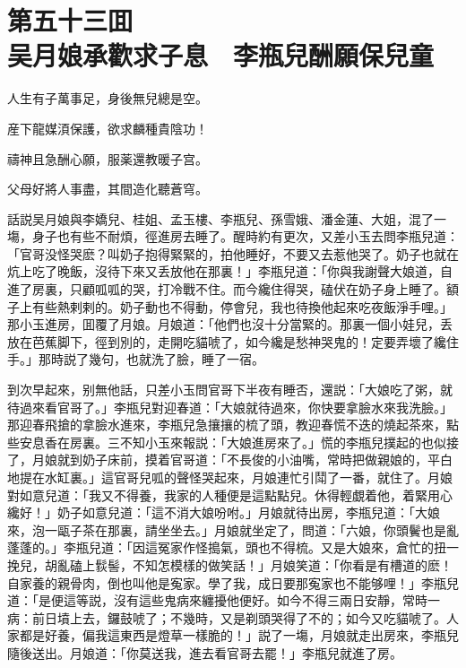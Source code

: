 
\chapter*{第五十三囬　\\吴月娘承歡求子息　李瓶兒酬願保兒童}


\begin{myquote}
人生有子萬事足，身後無兒總是空。

産下龍媒湏保護，欲求麟種貴陰功！

禱神且急酬心願，服薬還教暖子宫。

父母好將人事盡，其間造化聽蒼穹。
\end{myquote}

話説吴月娘與李嬌兒、桂姐、孟玉樓、李瓶兒、孫雪娥、潘金蓮、大姐，混了一塲，身子也有些不耐煩，徑進房去睡了。醒時約有更次，又差小玉去問李瓶兒道：「官哥没怪哭麽？叫奶子抱得緊緊的，拍他睡好，不要又去惹他哭了。奶子也就在炕上吃了晚飯，沒待下來又丢放他在那裏！」李瓶兒道：「你與我謝聲大娘道，自進了房裏，只顧呱呱的哭，打冷戰不住。而今纔住得哭，磕伏在奶子身上睡了。額子上有些熱剌剌的。奶子動也不得動，停會兒，我也待換他起來吃夜飯淨手哩。」那小玉進房，囬覆了月娘。月娘道：「他們也沒十分當緊的。那裏一個小娃兒，丢放在芭蕉脚下，徑到別的，走開吃貓唬了，如今纔是愁神哭鬼的！定要弄壞了纔住手。」那時説了幾句，也就洗了臉，睡了一宿。

到次早起來，别無他話，只差小玉問官哥下半夜有睡否，還説：「大娘吃了粥，就待過來看官哥了。」李瓶兒對迎春道：「大娘就待過來，你快要拿臉水來我洗臉。」那迎春飛搶的拿臉水進來，李瓶兒急攘攘的梳了頭，教迎春慌不迭的燒起茶來，點些安息香在房裏。三不知小玉來報説：「大娘進房來了。」慌的李瓶兒撲起的也似接了，月娘就到奶子床前，摸着官哥道：「不長俊的小油嘴，常時把做親娘的，平白地提在水缸裏。」這官哥兒呱的聲怪哭起來，月娘連忙引鬦了一番，就住了。月娘對如意兒道：「我又不得養，我家的人種便是這點點兒。休得輕覷着他，着緊用心纔好！」奶子如意兒道：「這不消大娘吩咐。」月娘就待出房，李瓶兒道：「大娘來，泡一甌子茶在那裏，請坐坐去。」月娘就坐定了，問道：「六娘，你頭鬢也是亂蓬蓬的。」李瓶兒道：「因這冤家作怪搗氣，頭也不得梳。又是大娘來，倉忙的扭一挽兒，胡亂磕上䯼髻，不知怎模樣的做笑話！」月娘笑道：「你看是有槽道的麽！自家養的親骨肉，倒也叫他是寃家。學了我，成日要那寃家也不能够哩！」李瓶兒道：「是便這等説，沒有這些鬼病來纏擾他便好。如今不得三兩日安靜，常時一病：前日墳上去，鑼鼓唬了；不幾時，又是剃頭哭得了不的；如今又吃貓唬了。人家都是好養，偏我這東西是燈草一樣脆的！」説了一塲，月娘就走出房來，李瓶兒隨後送出。月娘道：「你莫送我，進去看官哥去罷！」李瓶兒就進了房。

